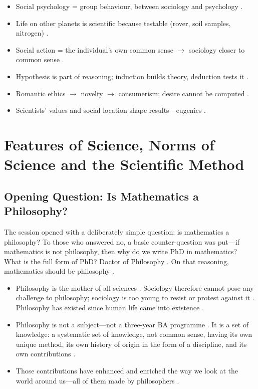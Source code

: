 \begin{QuickRevision}
\begin{itemize}
    \item Social psychology = group behaviour, between sociology and psychology .
    \item Life on other planets is scientific because testable (rover, soil samples, nitrogen) .
    \item Social action = the individual's own common sense $\rightarrow$ sociology closer to common sense .
    \item Hypothesis is part of reasoning; induction builds theory, deduction tests it .
    \item Romantic ethics $\rightarrow$ novelty $\rightarrow$ consumerism; desire cannot be computed .
    \item Scientists' values and social location shape results---eugenics .
\end{itemize}
\end{QuickRevision}

\sectiondivider

\section{Features of Science, Norms of Science and the Scientific Method}

\subsection{Opening Question: Is Mathematics a Philosophy?}
The session opened with a deliberately simple question: is mathematics a philosophy?  To those who answered no, a basic counter-question was put---if mathematics is not philosophy, then why do we write PhD in mathematics? What is the full form of PhD? Doctor of Philosophy . On that reasoning, mathematics should be philosophy .
\begin{itemize}
    \item Philosophy is the mother of all sciences . Sociology therefore cannot pose any challenge to philosophy; sociology is too young to resist or protest against it . Philosophy has existed since human life came into existence .
    \item Philosophy is not a subject---not a three-year BA programme . It is a set of knowledge: a systematic set of knowledge, not common sense, having its own unique method, its own history of origin in the form of a discipline, and its own contributions .
    \item Those contributions have enhanced and enriched the way we look at the world around us---all of them made by philosophers .
\end{itemize}

